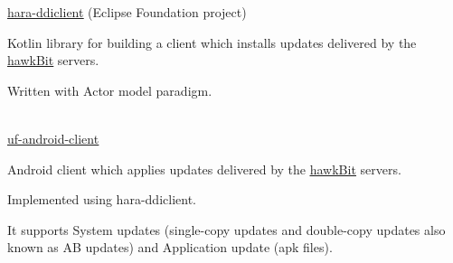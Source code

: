 \newpage
{}


\begin{cventries}

  \cventry
    {\href{https://github.com/eclipse-hara/hara-ddiclient}{\underline{hara-ddiclient}} (Eclipse Foundation project)} %
    {} %
    {} %
    {} %
    {
    \begin{cvitems}
    		\item Kotlin library for building a client which installs updates delivered by the \href{https://eclipse.dev/hawkit/}{\underline{hawkBit}} servers.
    		\item Written with Actor model paradigm.
    \end{cvitems}
    }
\\ 
  \cventry
    {\href{https://github.com/Kynetics/uf-android-client}{\underline{uf-android-client}}} %
    {} %
    {} %
    {} %
    {
    \begin{cvitems}
      \item Android client which applies updates delivered by the \href{https://eclipse.dev/hawkit/}{\underline{hawkBit}} servers.
    	  \item Implemented using hara-ddiclient.
    	  \item It supports System updates (single-copy updates and double-copy updates also known as AB updates) and Application update (apk files).
    \end{cvitems}
    }

\end{cventries}
